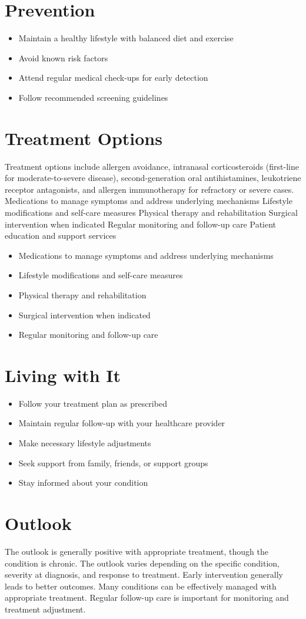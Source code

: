 \section{Prevention}
\begin{itemize}[noitemsep]
  \item Maintain a healthy lifestyle with balanced diet and exercise
  \item Avoid known risk factors
  \item Attend regular medical check-ups for early detection
  \item Follow recommended screening guidelines
\end{itemize}
\section{Treatment Options}
Treatment options include allergen avoidance, intranasal corticosteroids (first-line for moderate-to-severe disease), second-generation oral antihistamines, leukotriene receptor antagonists, and allergen immunotherapy for refractory or severe cases. Medications to manage symptoms and address underlying mechanisms Lifestyle modifications and self-care measures Physical therapy and rehabilitation Surgical intervention when indicated Regular monitoring and follow-up care Patient education and support services

\begin{itemize}[noitemsep]
  \item Medications to manage symptoms and address underlying mechanisms
  \item Lifestyle modifications and self-care measures
  \item Physical therapy and rehabilitation
  \item Surgical intervention when indicated
  \item Regular monitoring and follow-up care
\end{itemize}
\section{Living with It}
\begin{itemize}[noitemsep]
  \item Follow your treatment plan as prescribed
  \item Maintain regular follow-up with your healthcare provider
  \item Make necessary lifestyle adjustments
  \item Seek support from family, friends, or support groups
  \item Stay informed about your condition
\end{itemize}
\section{Outlook}
The outlook is generally positive with appropriate treatment, though the condition is chronic. The outlook varies depending on the specific condition, severity at diagnosis, and response to treatment. Early intervention generally leads to better outcomes. Many conditions can be effectively managed with appropriate treatment. Regular follow-up care is important for monitoring and treatment adjustment.
